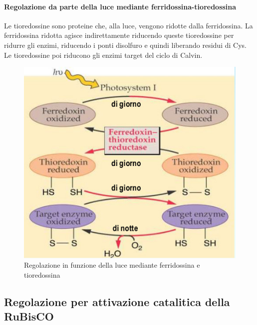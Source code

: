 \documentclass[a4paper,12pt]{book}
\begin{document}
\paragraph{Regolazione da parte della luce mediante ferridossina-tioredossina}
Le tioredossine sono proteine che, alla luce, vengono ridotte dalla ferridossina. La ferridossina ridotta agisce indirettamente riducendo queste tioredossine per ridurre gli enzimi, riducendo i ponti disolfuro e quindi liberando residui di Cys. Le tioredossine poi riducono gli enzimi target del ciclo di Calvin.
\begin{figure}[H]
\centering
\includegraphics[scale=0.4]{immagini/reg2.jpg}
\caption{Regolazione in funzione della luce mediante ferridossina e tioredossina}
\end{figure}
\subsection{Regolazione per attivazione catalitica della RuBisCO}
\end{document}
